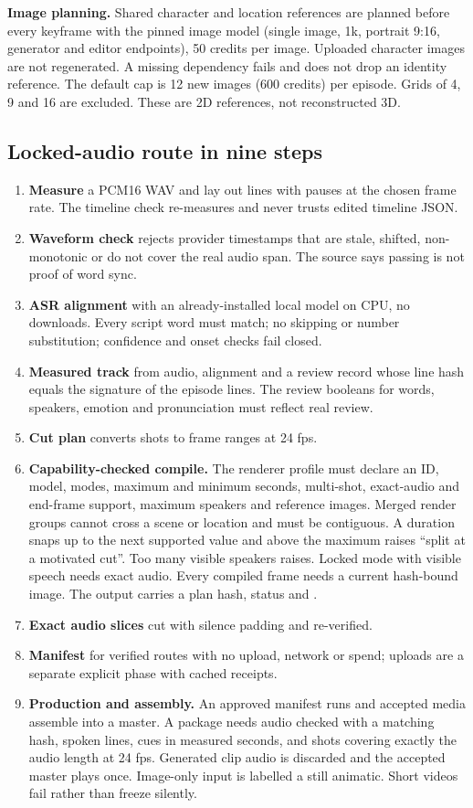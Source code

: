 \documentclass[11pt,a4paper]{article}
\newcommand{\code}[1]{\texttt{\detokenize{#1}}}
\begin{document}
\textbf{Image planning.} Shared character and location references are planned before every keyframe with the pinned image model (single image, 1k, portrait 9:16, generator and editor endpoints), 50 credits per image. Uploaded character images are not regenerated. A missing dependency fails and does not drop an identity reference. The default cap is 12 new images (600 credits) per episode. Grids of 4, 9 and 16 are excluded. These are 2D references, not reconstructed 3D.

\subsection{Locked-audio route in nine steps}
\begin{enumerate}
\item \textbf{Measure} a PCM16 WAV and lay out lines with pauses at the chosen frame rate. The timeline check re-measures and never trusts edited timeline JSON.
\item \textbf{Waveform check} rejects provider timestamps that are stale, shifted, non-monotonic or do not cover the real audio span. The source says passing is not proof of word sync.
\item \textbf{ASR alignment} with an already-installed local model on CPU, no downloads. Every script word must match; no skipping or number substitution; confidence and onset checks fail closed.
\item \textbf{Measured track} from audio, alignment and a review record whose line hash equals the signature of the episode lines. The review booleans for words, speakers, emotion and pronunciation must reflect real review.
\item \textbf{Cut plan} converts shots to frame ranges at 24 fps.
\item \textbf{Capability-checked compile.} The renderer profile must declare an ID, model, modes, maximum and minimum seconds, multi-shot, exact-audio and end-frame support, maximum speakers and reference images. Merged render groups cannot cross a scene or location and must be contiguous. A duration snaps up to the next supported value and above the maximum raises ``split at a motivated cut''. Too many visible speakers raises. Locked mode with visible speech needs exact audio. Every compiled frame needs a current hash-bound image. The output carries a plan hash, status \code{compiled_not_rendered} and \code{paid_requests: 0}.
\item \textbf{Exact audio slices} cut with silence padding and re-verified.
\item \textbf{Manifest} for verified routes with no upload, network or spend; uploads are a separate explicit phase with cached receipts.
\item \textbf{Production and assembly.} An approved manifest runs and accepted media assemble into a master. A package needs audio checked with a matching hash, spoken lines, cues in measured seconds, and shots covering exactly the audio length at 24 fps. Generated clip audio is discarded and the accepted master plays once. Image-only input is labelled a still animatic. Short videos fail rather than freeze silently.
\end{enumerate}
\end{document}
